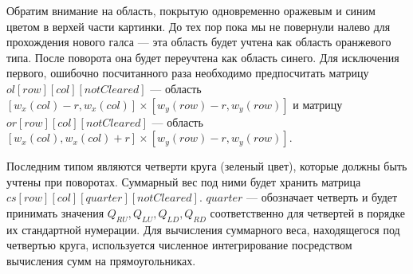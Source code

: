 Обратим внимание на область, покрытую одновременно оражевым и синим цветом в верхей части картинки.
До тех пор пока мы не повернули налево для прохождения нового галса --- эта область будет
учтена как область оранжевого типа. После поворота она будет переучтена как область синего.
Для исключения первого, ошибочно посчитанного раза необходимо предпосчитать
матрицу $ol[row][col][notCleared]$ --- область $[w_x(col)-r, w_x(col)] \times [w_y(row)-r, w_y(row)]$
и матрицу $or[row][col][notCleared]$ --- область $[w_x(col),w_x(col)+r]\times [w_y(row)-r, w_y(row)]$.

Последним типом являются четверти круга (зеленый цвет), которые должны быть учтены при поворотах.
Суммарный вес под ними будет хранить матрица $cs[row][col][quarter][notCleared]$.
$quarter$ --- обозначает четверть и будет принимать значения $Q_{RU}, Q_{LU}, Q_{LD}, Q_{RD}$
соответственно для четвертей в порядке их стандартной нумерации. Для вычисления суммарного
веса, находящегося под четвертью круга, используется численное интегрирование посредством
вычисления сумм на прямоугольниках.
\FloatBarrier
